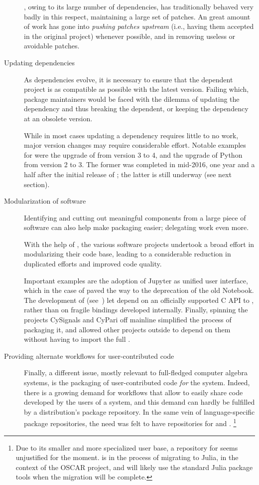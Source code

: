 \documentclass{deliverablereport}
\begin{document}
\begin{description}
  \Sage, owing to its large number of dependencies, has traditionally
  behaved very badly in this respect, maintaining a large set of
  patches. %
  An great amount of work has gone into \emph{pushing patches
    upstream} (i.e., having them accepted in the original project)
  whenever possible, and in removing useless or avoidable patches.
  
\item[Updating dependencies] As dependencies evolve, it is necessary
  to ensure that the dependent project is as compatible as possible
  with the latest version. %
  Failing which, package maintainers would be faced with the dilemma
  of updating the dependency and thus breaking the dependent, or
  keeping the dependency at an obsolete version.

  While in most cases updating a dependency requires little to no
  work, major version changes may require considerable effort. %
  Notable examples for \Sage were the upgrade of \Singular from
  version 3 to 4, and the upgrade of Python from version 2 to 3. %
  The former was completed in mid-2016, one year and a half after the
  initial release of ; the latter is still underway (see
  next section).
  
\item[Modularization of \ODK software] Identifying and cutting out
  meaningful components from a large piece of software can also help
  make packaging easier; delegating work even more.

  With the help of \ODK, the various software projects undertook a
  broad effort in modularizing their code base, leading to a
  considerable reduction in duplicated efforts and improved code
  quality. %

  Important examples are the adoption of Jupyter as unified user
  interface, which in the case of \Sage paved the way to the
  deprecation of the old Notebook. %
  The development of \libGAP (see~) let
  \Sage depend on an officially supported C API to \GAP, rather than
  on fragile bindings developed internally. %
  Finally, spinning the projects CySignals and CyPari off mainline
  \Sage simplified the process of packaging it, and allowed other
  projects outside \ODK to depend on them without having to import the
  full \Sage.

\item[Providing alternate workflows for user-contributed code]
  Finally, a different issue, mostly relevant to full-fledged computer
  algebra systems, is the packaging of user-contributed code
  \emph{for} the system. %
  Indeed, there is a growing demand for workflows that allow to easily
  share code developed by the users of a system, and this demand can
  hardly be fulfilled by a distribution's package repository. %
  In the same vein of language-specific package repositories, the need
  was felt to have repositories for \Sage and \GAP.%
  \footnote{Due to its smaller and more specialized user base, a
    repository for \PariGP seems unjustified for the moment. %
    \Singular is in the process of migrating to Julia, in the context
    of the OSCAR project, and will likely use the standard Julia
    package tools when the migration will be complete.} %
  

\end{description}
\end{document}
